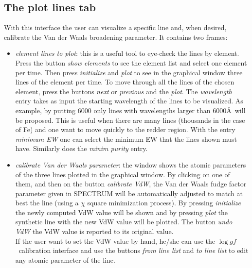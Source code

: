 \documentclass[a4paper,10pt]{article}
\newcommand\loggf{$\log gf$}
\begin{document}
\subsection{The plot lines tab}
With this interface the user can visualize a specific line and, when
desired, calibrate the Van der Waals broadening parameter.
It contains two frames:\\
\begin{itemize}
%
\item {\em element lines to plot}: this is a useful tool to eye-check the lines by element. Press the button
{\em show elements} to see the element list and select one element per time.
Then press {\em initialize} and {\em plot} to see in the graphical window three lines of the
element per time. To move through all the lines of the chosen element, press the buttons
{\em next} or {\em previous} and the {\em plot}. The {\em wavelength} entry
takes as input the starting wavelength of the lines to be visualized. As
example, by putting 6000 only lines with wavelengths larger than 6000\AA\
will be proposed. This is
useful when there are many lines (thousands in the case of Fe) and one want
to move quickly to the redder region. With the entry {\em minimum EW} one can select the minimum EW that
the lines shown must have. Similarly does the {\em minim purity} entry.
%
\item {\em calibrate Van der Waals parameter}: the window shows the atomic
parameters of the three lines plotted in the graphical window. By clicking
on one of them, and then on the button {\em calibrate VdW}, the Van der Waals
fudge factor parameter given in SPECTRUM will be automatically adjusted to match at best
the line (using a $\chi$ square minimization process). 
By pressing {\em initialize} the newly computed VdW value will be shown and
by pressing {\em plot} the synthetic line with the new VdW value will be
plotted. The button {\em undo VdW} the VdW value is reported to its original
value.\\
If the user want to set the VdW value by hand, he/she can use the \loggf\ 
calibration interface and use the buttons {\em from line list} and  {\em to line
list} to edit any atomic parameter of the line.

%
\end{itemize}
\end{document}
